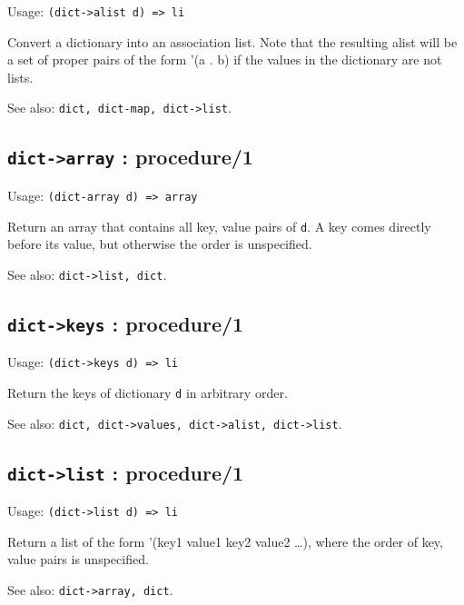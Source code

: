 \documentclass[
]{article}
\newcommand{\passthrough}[1]{#1}
\begin{document}
Usage: \passthrough{\lstinline!(dict->alist d) => li!}

Convert a dictionary into an association list. Note that the resulting
alist will be a set of proper pairs of the form '(a . b) if the values
in the dictionary are not lists.

See also: \passthrough{\lstinline!dict, dict-map, dict->list!}.

\hypertarget{dict-array-procedure1-1}{%
\subsection{\texorpdfstring{\texttt{dict-\textgreater{}array} :
procedure/1}{dict-\textgreater array : procedure/1}}\label{dict-array-procedure1-1}}

Usage: \passthrough{\lstinline!(dict-array d) => array!}

Return an array that contains all key, value pairs of
\passthrough{\lstinline!d!}. A key comes directly before its value, but
otherwise the order is unspecified.

See also: \passthrough{\lstinline!dict->list, dict!}.

\hypertarget{dict-keys-procedure1-1}{%
\subsection{\texorpdfstring{\texttt{dict-\textgreater{}keys} :
procedure/1}{dict-\textgreater keys : procedure/1}}\label{dict-keys-procedure1-1}}

Usage: \passthrough{\lstinline!(dict->keys d) => li!}

Return the keys of dictionary \passthrough{\lstinline!d!} in arbitrary
order.

See also:
\passthrough{\lstinline!dict, dict->values, dict->alist, dict->list!}.

\hypertarget{dict-list-procedure1-1}{%
\subsection{\texorpdfstring{\texttt{dict-\textgreater{}list} :
procedure/1}{dict-\textgreater list : procedure/1}}\label{dict-list-procedure1-1}}

Usage: \passthrough{\lstinline!(dict->list d) => li!}

Return a list of the form '(key1 value1 key2 value2 \ldots), where the
order of key, value pairs is unspecified.

See also: \passthrough{\lstinline!dict->array, dict!}.
\end{document}
